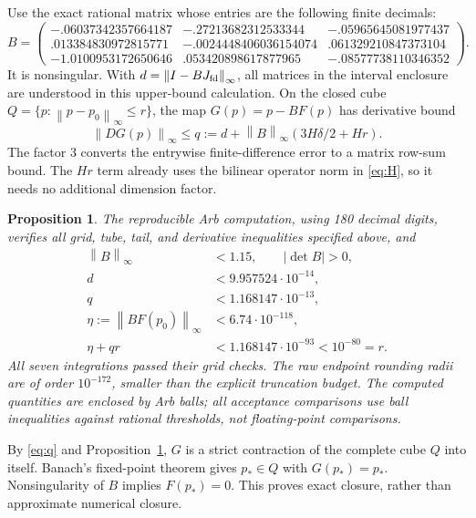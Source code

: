 \documentclass[11pt]{article}
\newtheorem{proposition}{Proposition}
\newcommand{\norm}[1]{\left\lVert#1\right\rVert}
\begin{document}
Use the exact rational matrix whose entries are the following finite decimals:
\[
 B=\begin{pmatrix}
 -.06037342357664187&-.27213682312533344&-.05965645081977437\\
 .013384830972815771&-.0024448406036154074&.061329210847373104\\
 -1.0100953172650646&.053420898617877965&-.08577738110346352
 \end{pmatrix}.
\]
It is nonsingular. With $d=\norm{I-BJ_{\rm fd}}_\infty$, all matrices
in the interval enclosure are understood in this upper-bound calculation.
On the closed cube $Q=\{p:\norm{p-p_0}_\infty\le r\}$, the map
$G(p)=p-BF(p)$ has derivative bound
\begin{equation}\label{eq:q}
 \norm{DG(p)}_\infty\le
 q:=d+\norm{B}_\infty(3H\delta/2+Hr).
\end{equation}
The factor $3$ converts the entrywise finite-difference error to a matrix
row-sum bound. The $Hr$ term already uses the bilinear operator norm in
\eqref{eq:H}, so it needs no additional dimension factor.

\begin{proposition}\label{prop:computation}
The reproducible Arb computation, using 180 decimal digits, verifies all
grid, tube, tail, and derivative inequalities specified above, and
\begin{align*}
 \norm{B}_\infty&<1.15,\qquad |\det B|>0,\\
 d&<9.957524\cdot10^{-14},\\
 q&<1.168147\cdot10^{-13},\\
 \eta:=\norm{BF(p_0)}_\infty&<6.74\cdot10^{-118},\\
 \eta+qr&<1.168147\cdot10^{-93}<10^{-80}=r.
\end{align*}
All seven integrations passed their grid checks. The raw endpoint
rounding radii are of order $10^{-172}$, smaller than the explicit
truncation budget. The computed quantities are enclosed by Arb balls;
all acceptance comparisons use ball inequalities against rational
thresholds, not floating-point comparisons.
\end{proposition}

By \eqref{eq:q} and Proposition~\ref{prop:computation}, $G$ is a strict
contraction of the complete cube $Q$ into itself. Banach's fixed-point
theorem gives $p_*\in Q$ with $G(p_*)=p_*$. Nonsingularity of $B$ implies
$F(p_*)=0$. This proves exact closure, rather than approximate numerical
closure.
\end{document}
